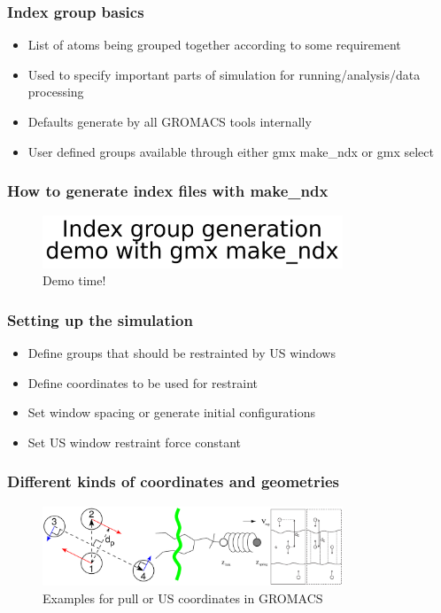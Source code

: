 \documentclass{beamer}
\numberwithin{table}{section}
\numberwithin{figure}{section}
\numberwithin{equation}{section}
\begin{document}
\begin{frame}
\frametitle{Index group basics}
    \begin{itemize}
        \item{List of atoms being grouped together according to some requirement}
        \item{Used to specify important parts of simulation for running/analysis/data processing}
        \item{Defaults generate by all GROMACS tools internally}
        \item{User defined groups available through either gmx make\_ndx or gmx select}
    \end{itemize}
\end{frame}

\begin{frame}
\frametitle{How to generate index files with make\_ndx}
    \begin{figure}[htb]
        \centering
        \includegraphics[keepaspectratio=true, width=0.8\textwidth]{figures/demo.pdf}
        \caption{Demo time!}
    \end{figure}
\end{frame}

\begin{frame}
\frametitle{Setting up the simulation}
    \begin{itemize}
        \item{Define groups that should be restrainted by US windows}
        \item{Define coordinates to be used for restraint}
        \item{Set window spacing or generate initial configurations}
        \item{Set US window restraint force constant}
    \end{itemize}
\end{frame}

\begin{frame}
\frametitle{Different kinds of coordinates and geometries}
    \begin{figure}[htb]
        \centering
        \includegraphics[keepaspectratio=true, width=0.8\textwidth]{figures/pull-coordinates.pdf}
        \caption{Examples for pull or US coordinates in GROMACS}
    \end{figure}
\end{frame}
\end{document}
